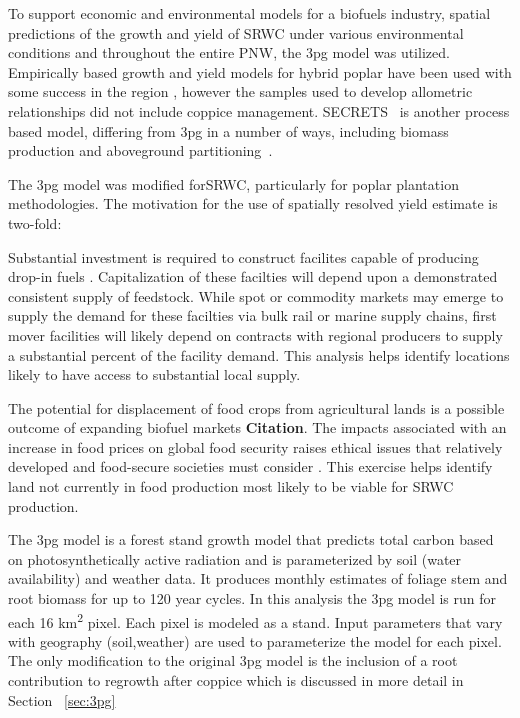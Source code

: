 \documentclass[preprint,12pt]{elsarticle}
\begin{document}
To support economic and environmental models for a biofuels industry,
spatial predictions of the growth and yield of \acf{SRWC} under
various environmental conditions and throughout the entire \acf{PNW},
the \acf{3pg}\cite{landsberg2010physiological,Landsberg1997,Sands2004}
model was utilized.  Empirically based growth and yield models for
hybrid poplar have been used with some success in the region
\cite{Clendenen1996}, however the samples used to develop allometric
 relationships did not include coppice management.
\ac{SECRETS}~\cite{Sampson2001} is another process based model,
differing from \ac{3pg} in a number of ways, including biomass
production and aboveground partitioning~\cite{SurendranNair2012}.

The \ac{3pg} model was modified for\ac{SRWC}, particularly
for poplar plantation methodologies. The motivation for the use of
spatially resolved yield estimate is two-fold:
\begin{description}
\item[Biofuels production system optimization] Substantial investment
  is required to construct facilites capable of producing drop-in
  fuels \cite{Parker2010a}. Capitalization of these facilties will
  depend upon a demonstrated
  consistent supply of feedstock. While spot or commodity markets may
  emerge to supply the demand for these facilties via bulk rail or
  marine supply chains, first mover facilities will
  likely depend on contracts with regional producers to supply a
  substantial percent of the facility demand. This analysis helps
  identify locations likely to have access to substantial local
  supply.
\item[Land use] The potential for displacement of food crops from
  agricultural lands is a possible outcome of expanding biofuel
  markets \textbf{Citation}. The impacts associated with an increase in food
  prices on global food security raises ethical issues that relatively
  developed and food-secure societies must consider
  \cite{Pimentel2008}. This exercise helps identify land not currently
  in food production most likely to be viable for \ac{SRWC} production.
\item
\end{description}

The \ac{3pg} model \cite{Landsberg1997} is a forest stand growth model
that predicts total carbon based on photosynthetically active
radiation and is parameterized by soil (water availability) and
weather data. It produces monthly estimates of foliage stem and root
biomass for up to 120 year cycles. In this analysis the \ac{3pg} model
is run for each 16 km\textsuperscript{2} pixel. Each pixel is modeled
as a stand. Input parameters that vary with geography (soil,weather)
are used to parameterize the model for each pixel. The only
modification to the original \ac{3pg} model is the inclusion of a root
contribution to regrowth after coppice which is discussed in more
detail in Section ~\ref{sec:3pg}
\end{document}

